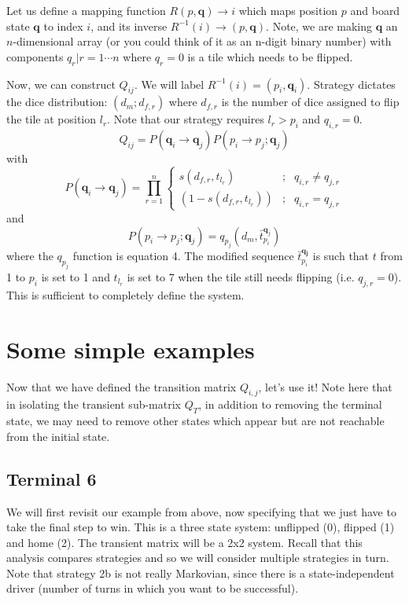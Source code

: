 \documentclass[letterpaper,11pt]{article}
\begin{document}
Let us define a mapping function
$R(p,\mathbf{q})\rightarrow i$ which maps position $p$ and board state 
$\mathbf{q}$ to index $i$, and its inverse 
$R^{-1}(i)\rightarrow(p,\mathbf{q})$.  Note, we are
making $\mathbf{q}$ an $n$-dimensional array (or you could think of it as an
n-digit binary number) with components $q_r|r=1\cdots n$ where $q_r=0$ is a
tile which needs to be flipped.  

Now, we can
construct $Q_{ij}$.  We will label $R^{-1}(i) = (p_i, \mathbf{q}_i)$.  Strategy
dictates the dice distribution: $(d_m;d_{f,r})$ where $d_{f,r}$ is the number
of dice assigned to flip the tile at position $l_r$.  Note that our strategy
requires $l_r>p_i$ and $q_{i,r}=0$.
\[
	Q_{ij} = P(\mathbf{q}_i\rightarrow\mathbf{q}_j)P(p_i \rightarrow p_j;\mathbf{q}_j)
\]
with
\[
	P(\mathbf{q}_i\rightarrow\mathbf{q}_j)=\prod_{r=1}^{n} 
	\left\{
		\begin{array}{lrl}
			s(d_{f,r},t_{l_r}) & ; & q_{i,r} \neq q_{j,r} \\
			\left(1-s(d_{f,r},t_{l_r})\right) &;& q_{i,r} = q_{j,r}
		\end{array}
	\right. 
\]
and
\[
	P(p_i \rightarrow p_j;\mathbf{q}_j)=q_{p_j}(d_m,\bar{t}_{p_i}^{\mathbf{q}_j})
\]
where the $q_{p_j}$ function is equation 4.  The modified sequence 
$\bar{t}_{p_i}^\mathbf{q_j}$ is such that $t$ from 1 to $p_i$ is set to 1 and
$t_{l_r}$ is set to 7 when the tile still needs flipping (i.e. $q_{j,r}=0$).
This is sufficient to completely define the system.

\section{Some simple examples}
Now that we have defined the transition matrix $Q_{i,j}$, let's use it!  Note
here that in isolating the transient sub-matrix $Q_T$, in addition to removing
the terminal state, we may need to remove other states which appear but are
not reachable from the initial state.  

\subsection{Terminal 6}
We will first revisit our example from above, now specifying that we just
have to take the final step to win.  This is a three state system: unflipped
(0), flipped (1) and home (2).  The transient matrix will be a 2x2 system.
Recall that this analysis compares strategies and so we will consider multiple
strategies in turn.  Note that strategy 2b is not really Markovian, since
there is a state-independent driver (number of turns in which you want to be
successful). 
\end{document}
